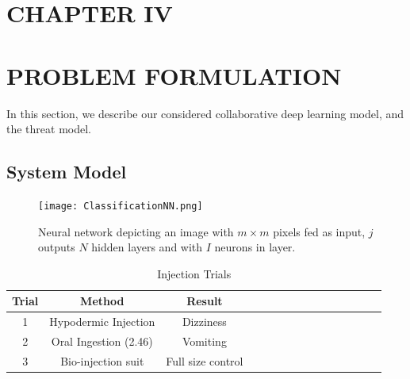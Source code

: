 \documentclass[letterpaper]{article}
\begin{document}
\begin{flushleft}
{\pagebreak
\section*{CHAPTER IV}
\vspace{0.25in}
\section{PROBLEM FORMULATION}

In this section, we describe our considered collaborative deep learning model, and the threat model. 

\subsection{System Model} \label{sec:systemModel}
\begin{figure}[H]
  \centering
    \texttt{[image: ClassificationNN.png]}
    \caption[A simple neural network.]{\label{fig:ClassNN} Neural network depicting an image with $m \times m$ pixels fed as input, $j$ outputs  $N$  hidden layers and with $I$ neurons in layer.}
  \end{figure}



\begin{table}[ht]
\centering %
\caption[Pym injection Trials]{Injection Trials} %
\label{table:pym} %
\begin{tabular}{*{15}{c}} %
\hline\hline %
Trial & Method & Result  \\ [0.5ex] %
\hline%
1 & Hypodermic Injection & Dizziness \\ %
2 & Oral Ingestion (2.46) & Vomiting \\
3 & Bio-injection suit  & Full size control  \\
\hline %
\hline


\end{tabular}
\end{table}}
\end{flushleft}
\end{document}
